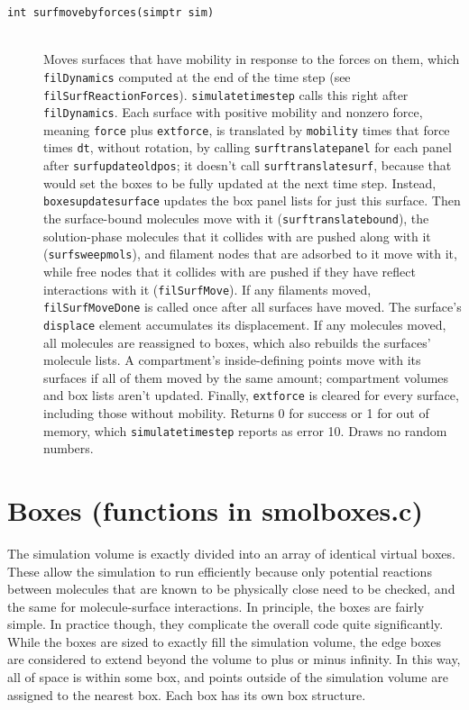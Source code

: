 \documentclass {scrbook}
\newcommand {\ttt} {\texttt}
\begin{document}
\begin{description}
\item[\ttt{int surfmovebyforces(simptr sim)}]
\hfill \\
Moves surfaces that have mobility in response to the forces on them, which \ttt{filDynamics} computed at the end of the time step (see \ttt{filSurfReactionForces}). \ttt{simulatetimestep} calls this right after \ttt{filDynamics}. Each surface with positive mobility and nonzero force, meaning \ttt{force} plus \ttt{extforce}, is translated by \ttt{mobility} times that force times \ttt{dt}, without rotation, by calling \ttt{surftranslatepanel} for each panel after \ttt{surfupdateoldpos}; it doesn't call \ttt{surftranslatesurf}, because that would set the boxes to be fully updated at the next time step. Instead, \ttt{boxesupdatesurface} updates the box panel lists for just this surface. Then the surface-bound molecules move with it (\ttt{surftranslatebound}), the solution-phase molecules that it collides with are pushed along with it (\ttt{surfsweepmols}), and filament nodes that are adsorbed to it move with it, while free nodes that it collides with are pushed if they have reflect interactions with it (\ttt{filSurfMove}). If any filaments moved, \ttt{filSurfMoveDone} is called once after all surfaces have moved. The surface's \ttt{displace} element accumulates its displacement. If any molecules moved, all molecules are reassigned to boxes, which also rebuilds the surfaces' molecule lists. A compartment's inside-defining points move with its surfaces if all of them moved by the same amount; compartment volumes and box lists aren't updated. Finally, \ttt{extforce} is cleared for every surface, including those without mobility. Returns 0 for success or 1 for out of memory, which \ttt{simulatetimestep} reports as error 10. Draws no random numbers.

\end{description}

\section{Boxes (functions in smolboxes.c)}

The simulation volume is exactly divided into an array of identical virtual boxes. These allow the simulation to run efficiently because only potential reactions between molecules that are known to be physically close need to be checked, and the same for molecule-surface interactions. In principle, the boxes are fairly simple. In practice though, they complicate the overall code quite significantly. While the boxes are sized to exactly fill the simulation volume, the edge boxes are considered to extend beyond the volume to plus or minus infinity. In this way, all of space is within some box, and points outside of the simulation volume are assigned to the nearest box.
Each box has its own box structure.
\end{document}
